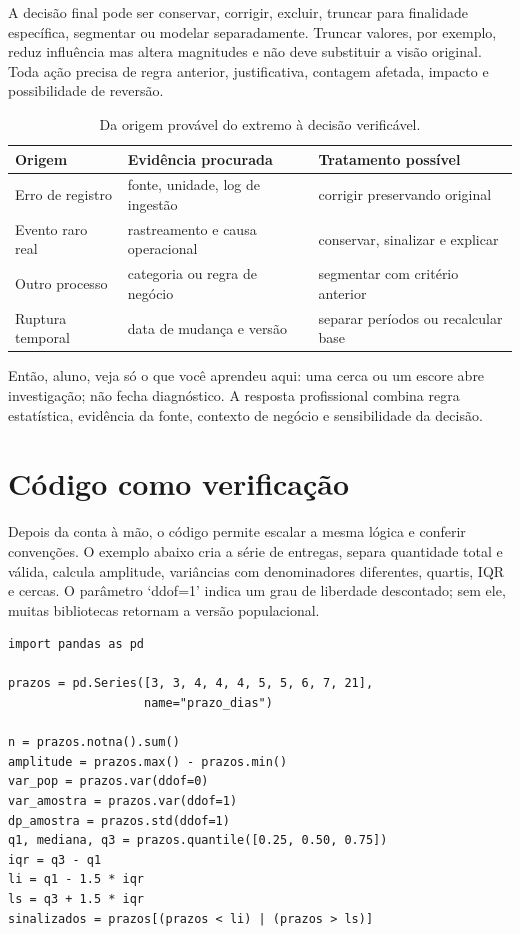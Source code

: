 A decisão final pode ser conservar, corrigir, excluir, truncar para finalidade específica, segmentar ou modelar separadamente. Truncar valores, por exemplo, reduz influência mas altera magnitudes e não deve substituir a visão original. Toda ação precisa de regra anterior, justificativa, contagem afetada, impacto e possibilidade de reversão.

\begin{table}[htbp]
\centering
\small
\caption{Da origem provável do extremo à decisão verificável.}
\label{tab:outlier-decisao}
\begin{tabularx}{0.95\textwidth}{@{}p{2.7cm}YY@{}}
\toprule
\textbf{Origem} & \textbf{Evidência procurada} & \textbf{Tratamento possível} \\
\midrule
Erro de registro & fonte, unidade, log de ingestão & corrigir preservando original \\
Evento raro real & rastreamento e causa operacional & conservar, sinalizar e explicar \\
Outro processo & categoria ou regra de negócio & segmentar com critério anterior \\
Ruptura temporal & data de mudança e versão & separar períodos ou recalcular base \\
\bottomrule
\end{tabularx}
\end{table}

\begin{SummaryBox}
Então, aluno, veja só o que você aprendeu aqui: uma cerca ou um escore abre investigação; não fecha diagnóstico. A resposta profissional combina regra estatística, evidência da fonte, contexto de negócio e sensibilidade da decisão.
\end{SummaryBox}

\section{Código como verificação}

Depois da conta à mão, o código permite escalar a mesma lógica e conferir convenções. O exemplo abaixo cria a série de entregas, separa quantidade total e válida, calcula amplitude, variâncias com denominadores diferentes, quartis, IQR e cercas. O parâmetro `ddof=1' indica um grau de liberdade descontado; sem ele, muitas bibliotecas retornam a versão populacional.

\begin{verbatim}
import pandas as pd

prazos = pd.Series([3, 3, 4, 4, 4, 5, 5, 6, 7, 21],
                   name="prazo_dias")

n = prazos.notna().sum()
amplitude = prazos.max() - prazos.min()
var_pop = prazos.var(ddof=0)
var_amostra = prazos.var(ddof=1)
dp_amostra = prazos.std(ddof=1)
q1, mediana, q3 = prazos.quantile([0.25, 0.50, 0.75])
iqr = q3 - q1
li = q1 - 1.5 * iqr
ls = q3 + 1.5 * iqr
sinalizados = prazos[(prazos < li) | (prazos > ls)]
\end{verbatim}

